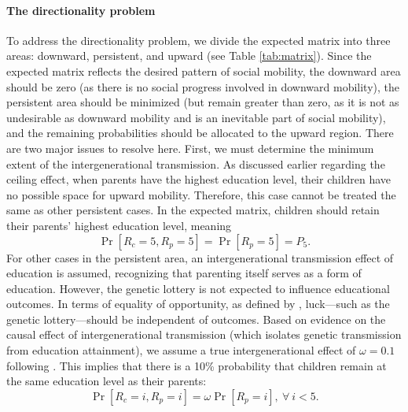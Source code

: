 \paragraph{The directionality problem}
To address the directionality problem, we divide the expected matrix into three areas: downward, persistent, and upward (see Table \ref{tab:matrix}). Since the expected matrix reflects the desired pattern of social mobility, the downward area should be zero (as there is no social progress involved in downward mobility), the persistent area should be minimized (but remain greater than zero, as it is not as undesirable as downward mobility and is an inevitable part of social mobility), and the remaining probabilities should be allocated to the upward region. There are two major issues to resolve here. First, we must determine the minimum extent of the intergenerational transmission. As discussed earlier regarding the ceiling effect, when parents have the highest education level, their children have no possible space for upward mobility. Therefore, this case cannot be treated the same as other persistent cases. In the expected matrix, children should retain their parents' highest education level, meaning  
\[
\operatorname{Pr}[R_c=5, R_p=5]=\operatorname{Pr}[R_p=5]=P_5.
\]
For other cases in the persistent area, an intergenerational transmission effect of education is assumed, recognizing that parenting itself serves as a form of education. However, the genetic lottery is not expected to influence educational outcomes. In terms of equality of opportunity, as defined by \citet{roemer2015equality}, luck—such as the genetic lottery—should be independent of outcomes. Based on evidence on the causal effect of intergenerational transmission (which isolates genetic transmission from education attainment), we assume a true intergenerational effect of \(\omega=0.1\) following \citet{holmlund2011causal}. This implies that there is a 10\% probability that children remain at the same education level as their parents:  
\[
\operatorname{Pr}[ R_{c} =i, R_{p} =i] =\omega \operatorname{Pr}[ R_{p} =i],\ \forall \ i< 5.
\]

